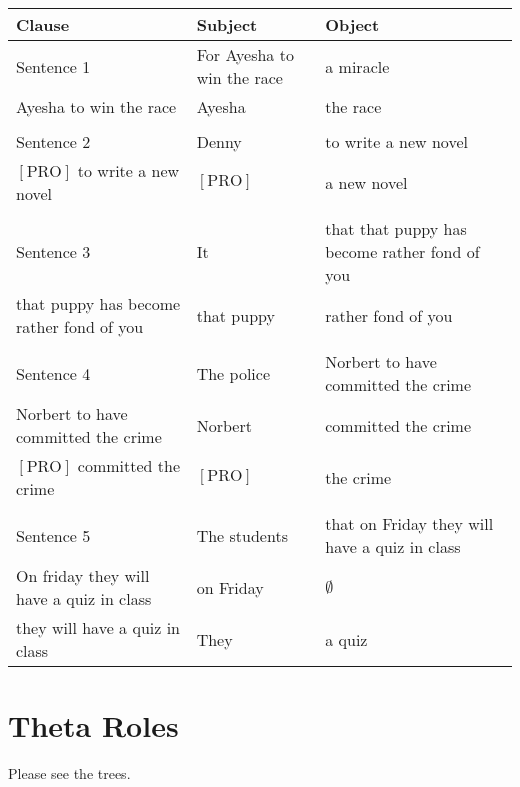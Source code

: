 \documentclass[20pt]{article}
\newcommand{\feature}[1]{\ensuremath{\left[ \text{#1} \right]}}
\begin{document}
\begin{tabular}{l|l|l}
  Clause & Subject & Object \\
  \hline
  Sentence 1 & For Ayesha to win the race & a miracle \\ 
  Ayesha to win the race & Ayesha & the race \\
  & & \\
  Sentence 2 & Denny & to write a new novel \\
  \feature{PRO} to write a new novel & \feature{PRO} & a new novel \\
  & & \\
  Sentence 3 & It & that that puppy has become rather fond of you \\
  that puppy has become rather fond of you & that puppy & rather fond of you \\
  & & \\
  Sentence 4 & The police & Norbert to have committed the crime \\
  Norbert to have committed the crime & Norbert & committed the crime \\
  \feature{PRO} committed the crime & \feature{PRO} & the crime \\
  & & \\
  Sentence 5 & The students & that on Friday they will have a quiz in class \\
  On friday they will have a quiz in class & on Friday & $\emptyset$ \\
  they will have a quiz in class & They & a quiz \\
\end{tabular}

\section{Theta Roles}
Please see the trees.
\end{document}

